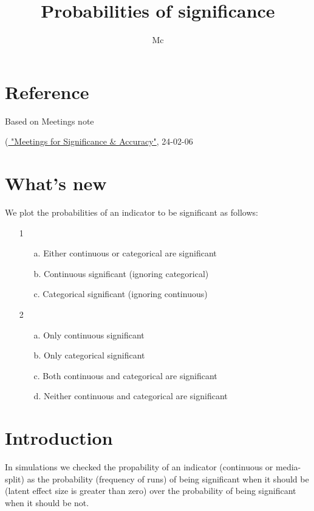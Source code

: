 \documentclass{article}
\begin{document}


\title{Probabilities of significance}

\author{Mc}
\maketitle
\section*{Reference}
Based on Meetings note
 
(\href{https://docs.google.com/document/d/1zhUdzu9HjuZ8tqvLVKh6QoqIphHgWVrIHosbvRAGGvs/edit}{ "Meetings for Significance \& Accuracy"}, 24-02-06 

\section*{What's new}

We plot the probabilities of an indicator to be significant as follows:
\begin{itemize}
\item [{1}] 
\begin{itemize}
\item [{a.}] Either continuous or categorical are significant 
\item [{b.}] Continuous significant (ignoring categorical) 
\item [{c.}] Categorical significant (ignoring continuous) 
\end{itemize}
\item [{2}] 
\begin{itemize}
\item [{a.}] Only continuous significant 
\item [{b.}] Only categorical significant 
\item [{c.}] Both continuous and categorical are significant 
\item [{d.}] Neither continuous and categorical are significant 
 
\end{itemize}
 
\end{itemize}

\section*{Introduction}
In simulations we checked the propability of an indicator (continuous or media-split) as the probability (frequency of runs) of being significant when it should be (latent effect size is greater than zero) over the probability of being significant when it should be not.
\end{document}
